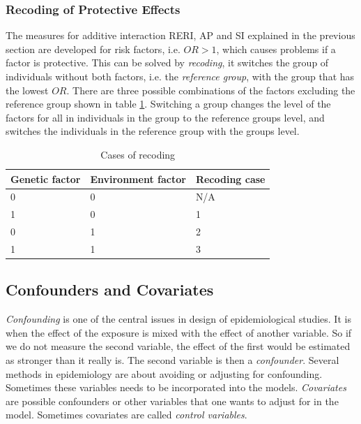 \documentclass[10pt,a4paper]{report}
\begin{document}
\subsubsection{Recoding of Protective Effects}
\label{recode}
The measures for additive interaction RERI, AP and SI explained in the previous section are developed for risk factors, i.e. $OR>1$, which causes problems if a factor is protective\cite{recoding_2011}. This can be solved by \emph{recoding}, it switches the group of individuals without both factors, i.e. the \emph{reference group}, with the group that has the lowest  $OR$\cite{recoding_2011}. There are three possible combinations of the factors excluding the reference group shown in table \ref{table:recoding_cases}. Switching a group changes the level of the factors for all in individuals in the group to the reference groups level, and switches the individuals in the reference group with the groups level.

\begin{table}[h]
\begin{tabular}{| l l l |}
  \hline
  Genetic factor & Environment factor & Recoding case\\
  \hline
  0 & 0 & N/A \\
  1 & 0 & 1 \\
  0 & 1 & 2 \\
  1 & 1 & 3 \\
  \hline
\end{tabular}
\caption{Cases of recoding}
\label{table:recoding_cases}
\end{table}

\subsection{Confounders and Covariates}
\emph{Confounding} is one of the central issues in design of epidemiological studies. It is when the effect of the exposure is mixed with the effect of another variable. So if we do not measure the second variable, the effect of the first would be estimated as stronger than it really is. The second variable is then a \emph{confounder}. Several methods in epidemiology are about avoiding or adjusting for confounding. Sometimes these variables needs to be incorporated into the models. \emph{Covariates} are possible confounders or other variables that one wants to adjust for in the model. Sometimes covariates are called \emph{control variables}.\cite{rothman2002intro_epidemiology,rothman2008modern}
\end{document}
